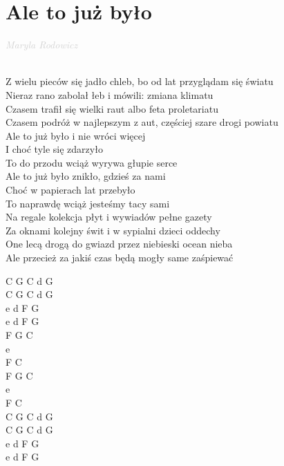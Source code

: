 \documentclass[a5paper, 10pt]{book}
\begin{document}
\section{Ale to już było}\textcolor{lightgray}{\textit{Maryla Rodowicz}}\\~\\
\begin{minipage}[t]{0.8\textwidth}
Z wielu pieców się jadło chleb, bo od lat przyglądam się światu\\
Nieraz rano zabolał łeb i mówili: zmiana klimatu\\
Czasem trafił się wielki raut albo feta proletariatu\\
Czasem podróż w najlepszym z aut, częściej szare drogi powiatu\\

\hspace*{2mm} Ale to już było i nie wróci więcej\\
\hspace*{2mm} I choć tyle się zdarzyło\\
\hspace*{2mm} To do przodu wciąż wyrywa głupie serce\\
\hspace*{2mm} Ale to już było znikło, gdzieś za nami\\
\hspace*{2mm} Choć w papierach lat przebyło\\
\hspace*{2mm} To naprawdę wciąż jesteśmy tacy sami\\

Na regale kolekcja płyt i wywiadów pełne gazety\\
Za oknami kolejny świt i w sypialni dzieci oddechy\\
One lecą drogą do gwiazd przez niebieski ocean nieba\\
Ale przecież za jakiś czas będą mogły same zaśpiewać\\

\end{minipage}
\begin{minipage}[t]{0.2\textwidth}

C G C d G\\
C G C d G\\
e d F G \\
e d F G \\

F G C\\
e\\
F C \\
F G C\\
e\\
F C \\

C G C d G\\
C G C d G\\
e d F G \\
e d F G \\

\end{minipage}
\end{document}
